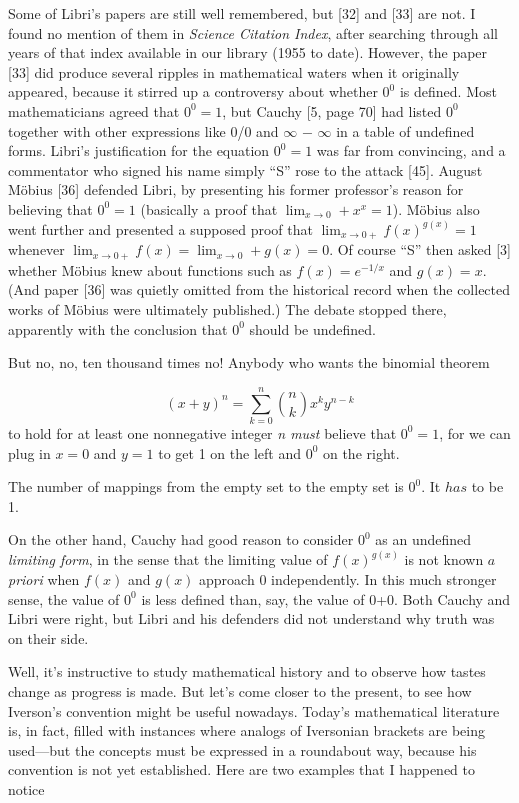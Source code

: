 \documentclass[10pt]{article}
\begin{document}
       Some of Libri’s papers are still well remembered, but [32] and [33] are not. I found no mention
of them in \textit{Science Citation Index}, after searching through all years of that index available in our
library (1955 to date). However, the paper [33] did produce several ripples in mathematical waters
when it originally appeared, because it stirred up a controversy about whether 
$0^0$ is defined. Most mathematicians agreed that $0^0 = 1$, but Cauchy [5, page 70] had listed $0^0$
together with other
expressions like 0/0 and $\infty$ $-$ $\infty$ in a table of undefined forms. Libri’s justification for the equation
$0^0 = 1$ was far from convincing, and a commentator who signed his name simply “S” rose to
the attack [45]. August M\"{o}bius [36] defended Libri, by presenting his former professor’s reason
for believing that $0^0 = 1$ (basically a proof that $\lim_{x\to0}+ x^x = 1$). M\"{o}bius also went further and
presented a supposed proof that $\lim_{x\to 0+}f(x)^{g(x)} = 1$ whenever $\lim_{x\to 0+} f(x) = \lim_{x\to 0}+ g(x) = 0$.
Of course “S” then asked [3] whether M\"{o}bius knew about functions such as $f(x) = e^{-1/x}$ and
$g(x) = x$. (And paper [36] was quietly omitted from the historical record when the collected works
of M\"{o}bius were ultimately published.) The debate stopped there, apparently with the conclusion
that $0^0$ should be undefined.

    But no, no, ten thousand times no! Anybody who wants the binomial theorem
    
\begin{equation}
(x+y)^n = \sum_{k=0}^{n} {{n}\choose{k}} x^k y^{n-k} \tag{1.18}
\end{equation} 
to hold for at least one nonnegative integer \textit{n must} believe that $0^0 = 1$, for we can plug in $x = 0$
and $y = 1$ to get 1 on the left and $0^0$ on the right.

    The number of mappings from the empty set to the empty set is $0^0$. It $has$ to be 1.
    
    
    On the other hand, Cauchy had good reason to consider $0^0$ as an undefined \textit{limiting form}, in
the sense that the limiting value of $f(x)^{g(x)}$ is not known $a$ \textit{priori} when $f(x)$ and $g(x)$ approach 0
independently. In this much stronger sense, the value of $0^0$
is less defined than, say, the value of
0+0. Both Cauchy and Libri were right, but Libri and his defenders did not understand why truth
was on their side.

    Well, it’s instructive to study mathematical history and to observe how tastes change as
progress is made. But let’s come closer to the present, to see how Iverson’s convention might
be useful nowadays. Today’s mathematical literature is, in fact, filled with instances where analogs
of Iversonian brackets are being used—but the concepts must be expressed in a roundabout way,
because his convention is not yet established. Here are two examples that I happened to notice
\end{document}
